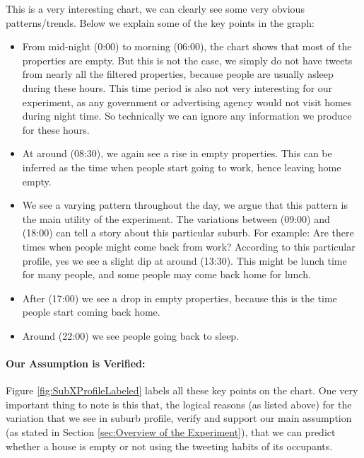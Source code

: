 \documentclass[12pt]{report}
\theoremstyle{named}
\begin{document}
This is a very interesting chart, we can clearly see some very obvious patterns/trends. Below we explain some of the key points in the graph:
\begin{itemize}
  \item From mid-night (0:00) to morning (06:00), the chart shows that most of the properties are empty. But this is not the case, we simply do not have tweets from nearly all the filtered properties, because people are usually asleep during these hours. This time period is also not very interesting for our experiment, as any government or advertising agency would not visit homes during night time. So technically we can ignore any information we produce for these hours.
  \item At around (08:30), we again see a rise in empty properties. This can be inferred as the time when people start going to work, hence leaving home empty.
  \item We see a varying pattern throughout the day, we argue that this pattern is the main utility of the experiment. The variations between (09:00) and (18:00) can tell a story about this particular suburb. For example: Are there times when people might come back from work? According to this particular profile, yes we see a slight dip at around (13:30). This might be lunch time for many people, and some people may come back home for lunch.
  \item After (17:00) we see a drop in empty properties, because this is the time people start coming back home.
  \item Around (22:00) we see people going back to sleep.
\end{itemize}
\paragraph{Our Assumption is Verified:\\}
Figure \ref{fig:SubXProfileLabeled} labels all these key points on the chart. One very important thing to note is this that, the logical reasons (as listed above) for the variation that we see in suburb profile, verify and support our main assumption (as stated in Section \ref{sec:Overview of the Experiment}), that we can predict whether a house is empty or not using the tweeting habits of its occupants. 
\end{document}
